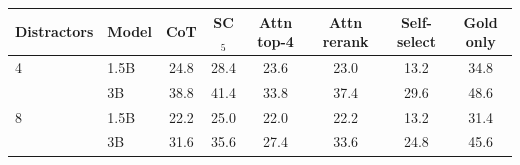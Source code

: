 \begin{tabular}{llcccccc}
\toprule
Distractors & Model & CoT & SC$_5$ & Attn top-4 & Attn rerank & Self-select & Gold only \\
\midrule
4 & 1.5B & 24.8 & 28.4 & 23.6 & 23.0 & 13.2 & 34.8 \\
 & 3B & 38.8 & 41.4 & 33.8 & 37.4 & 29.6 & 48.6 \\
\midrule
8 & 1.5B & 22.2 & 25.0 & 22.0 & 22.2 & 13.2 & 31.4 \\
 & 3B & 31.6 & 35.6 & 27.4 & 33.6 & 24.8 & 45.6 \\
\bottomrule
\end{tabular}
